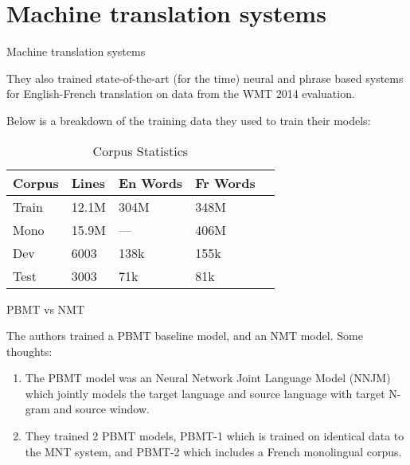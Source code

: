 \documentclass{beamer}
\begin{document}
\section{Machine translation systems}
\begin{frame}{Machine translation systems}

  They also trained state-of-the-art (for the time) neural and phrase based systems for English-French translation on data from the WMT 2014 evaluation.

  Below is a breakdown of the training data they used to train their models:

  \begin{table}[htbp]
    \centering
    \caption{Corpus Statistics}
    \label{tab:corpus_stats}
    \begin{tabular}{l|llll}
      \toprule
      Corpus & Lines & En Words & Fr Words \\
      \midrule
      Train & 12.1M & 304M & 348M \\
      Mono & 15.9M & --- & 406M \\
      Dev & 6003 & 138k & 155k \\
      Test & 3003 & 71k & 81k \\
      \bottomrule
    \end{tabular}
  \end{table}

\end{frame}

\begin{frame}{PBMT vs NMT}

  The authors trained a PBMT baseline model, and an NMT model. Some thoughts:

  \begin{enumerate}
    \item The PBMT model was an Neural Network Joint Language Model (NNJM) which jointly models the target language and source language with target N-gram and source window.
    \item They trained 2 PBMT models, PBMT-1 which is trained on identical data to the MNT system, and PBMT-2 which includes a French monolingual corpus. 
  \end{enumerate}
  
  \medskip

\end{frame}
\end{document}
